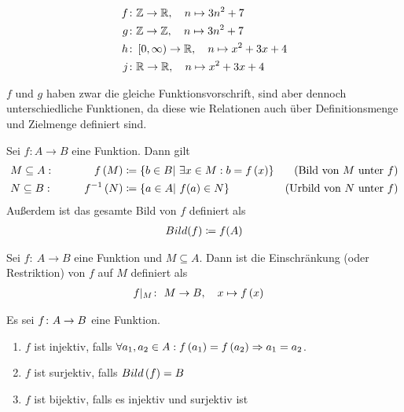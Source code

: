 \begin{beispiel}
    \theoremescape
    \begin{align*}
        f\colon &\mathbb{Z} \rightarrow \mathbb{R},\quad n\mapsto 3n^2+7\\
        g\colon &\mathbb{Z} \rightarrow \mathbb{Z},\quad n\mapsto 3n^2+7\\
        h\colon &\left[0, \infty\right) \rightarrow \mathbb{R},\quad n\mapsto x^2+3x+4\\
        j\colon &\mathbb{R} \rightarrow \mathbb{R},\quad n\mapsto x^2+3x+4\\
    \end{align*}
\end{beispiel}
\begin{bemerkung}
    $f$ und $g$ haben zwar die gleiche Funktionsvorschrift, sind aber dennoch unterschiedliche Funktionen, da diese wie Relationen auch über Definitionsmenge und Zielmenge definiert sind.
\end{bemerkung}

\begin{notation}
    Sei $f: A\rightarrow B$ eine Funktion.
    Dann gilt
    \begin{align*}
        &M \subseteq A:\qquad &f\left(M\right) &\coloneqq \left\{b\in B|~\exists x\in M: b=f\left(x\right)\right\}& (\text{Bild von } M \text{ unter } f)\\
        &N \subseteq B:\qquad &f^{-1}\left(N\right) &\coloneqq \left\{a\in A|~f(a)\in N\right\}& (\text{Urbild von } N \text{ unter } f)
    \end{align*}
    Außerdem ist das gesamte Bild von $f$ definiert als
    \begin{align*}
        Bild(f) \coloneqq f(A)
    \end{align*}
\end{notation}
\begin{definition}
    Sei $f\colon~A \rightarrow B$ eine Funktion und $M \subseteq A$.
    Dann ist die Einschränkung (oder Restriktion) von $f$ auf $M$ definiert als
    \begin{align*}
        f|_{M}\colon&~M \rightarrow B,\quad x \mapsto f\left(x\right)
    \end{align*}
\end{definition}
\begin{definition}
    Es sei $f\colon A\rightarrow{} B$ eine Funktion.
    \theoremescape
    \begin{enumerate}[label=(\roman*)]
        \item $f$ ist injektiv, falls $\forall a_1, a_2 \in A: f\left(a_1\right) = f\left(a_2\right) \Rightarrow{} a_1 = a_2$.
        \item $f$ ist surjektiv, falls $Bild\left(f\right) = B$
        \item $f$ ist bijektiv, falls es injektiv und surjektiv ist
    \end{enumerate}
\end{definition}

